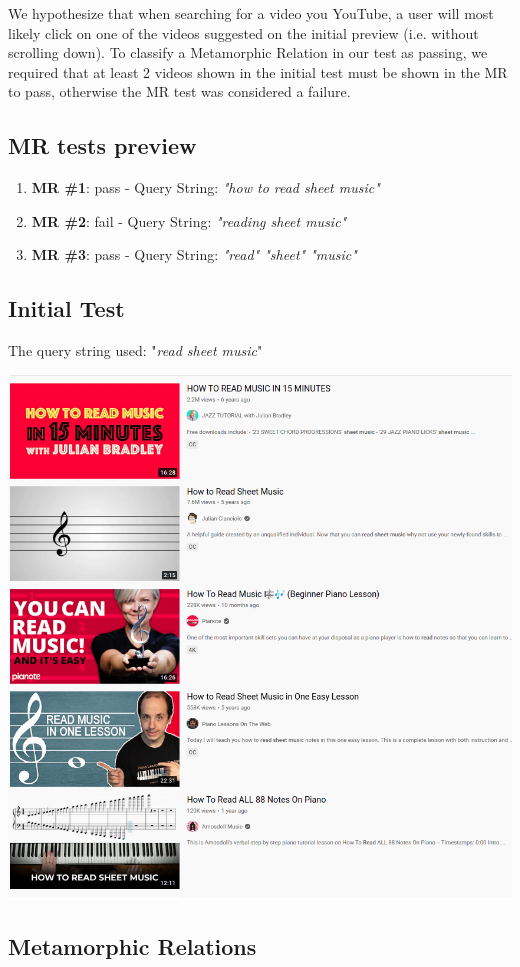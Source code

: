 \documentclass[12pt]{article}
\begin{document}
We hypothesize that when searching for a video you YouTube, a user will most likely click on one of the videos suggested on the initial preview (i.e. without scrolling down). To classify a Metamorphic Relation in our test as passing, we required that at least 2 videos shown in the initial test must be shown in the MR to pass, otherwise the MR test was considered a failure.

\subsection*{MR tests preview}

\begin{enumerate}
    \item \textbf{MR \#1}: pass - Query String: \textit{"how to read sheet music"}
    \item \textbf{MR \#2}: fail - Query String: \textit{"reading sheet music"}
    \item \textbf{MR \#3}: pass - Query String: \textit{"read" "sheet" "music"}
\end{enumerate}

\subsection*{Initial Test}

The query string used: "\textit{read sheet music}"

\begin{center}
    \includegraphics[width=0.5\columnwidth]{q3-initial-test.png}
\end{center}

\newpage
\subsection*{Metamorphic Relations}
\end{document}
